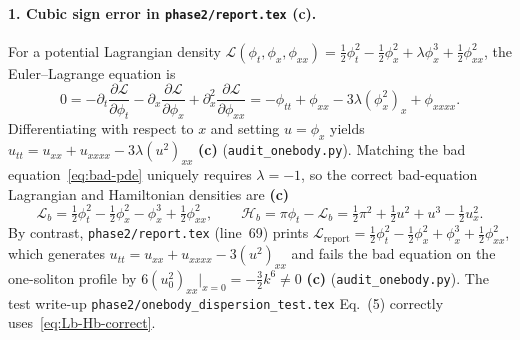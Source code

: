 \documentclass[11pt,a4paper]{article}
\newcommand{\claim}[1]{\textbf{(#1)}}
\begin{document}
\paragraph{1. Cubic sign error in \texttt{phase2/report.tex} \claim{c}.}
For a potential Lagrangian density $\mathcal{L}(\phi_t,\phi_x,\phi_{xx}) = \frac{1}{2}\phi_t^2 - \frac{1}{2}\phi_x^2 + \lambda\phi_x^3 + \frac{1}{2}\phi_{xx}^2$,
the Euler--Lagrange equation is
\begin{equation}
  0 = -\partial_t\frac{\partial\mathcal{L}}{\partial\phi_t}
      - \partial_x\frac{\partial\mathcal{L}}{\partial\phi_x}
      + \partial_x^2\frac{\partial\mathcal{L}}{\partial\phi_{xx}}
    = -\phi_{tt} + \phi_{xx} - 3\lambda(\phi_x^2)_x + \phi_{xxxx}.
\end{equation}
Differentiating with respect to $x$ and setting $u = \phi_x$ yields
$u_{tt} = u_{xx} + u_{xxxx} - 3\lambda(u^2)_{xx}$ \claim{c} (\texttt{audit\_onebody.py}).
Matching the bad equation~\eqref{eq:bad-pde} uniquely requires $\lambda = -1$, so the correct
bad-equation Lagrangian and Hamiltonian densities are \claim{c}
\begin{equation}
  \mathcal{L}_b = \tfrac{1}{2}\phi_t^2 - \tfrac{1}{2}\phi_x^2 - \phi_x^3 + \tfrac{1}{2}\phi_{xx}^2,
  \qquad
  \mathcal{H}_b = \pi\phi_t - \mathcal{L}_b
  = \tfrac{1}{2}\pi^2 + \tfrac{1}{2}u^2 + u^3 - \tfrac{1}{2}u_x^2.
  \label{eq:Lb-Hb-correct}
\end{equation}
By contrast, \texttt{phase2/report.tex} (line~69) prints
$\mathcal{L}_{\mathrm{report}} = \frac{1}{2}\phi_t^2 - \frac{1}{2}\phi_x^2 + \phi_x^3 + \frac{1}{2}\phi_{xx}^2$,
which generates $u_{tt} = u_{xx} + u_{xxxx} - 3(u^2)_{xx}$ and fails the bad equation on the
one-soliton profile by $6(u_0^2)_{xx}\big|_{x=0} = -\frac{3}{2}k^6 \neq 0$ \claim{c}
(\texttt{audit\_onebody.py}). The test write-up \texttt{phase2/onebody\_dispersion\_test.tex} Eq.~(5)
correctly uses~\eqref{eq:Lb-Hb-correct}.
\end{document}
